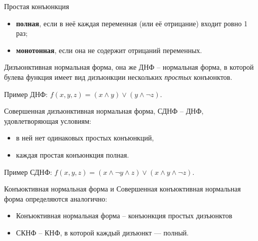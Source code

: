 \documentclass[a4paper,12pt]{article}
\begin{document}
\begin{enumerate}
        Простая конъюнкция
        \begin{itemize}
                \item \textbf{полная}, если в неё каждая переменная (или её отрицание) входит ровно 1 раз;
                \item \textbf{монотонная}, если она не содержит отрицаний переменных.
        \end{itemize}

        Дизъюнктивная нормальная форма, она же ДНФ -- нормальная форма, в которой булева функция имеет вид дизъюнкции нескольких \textit{простых} конъюнктов.

        Пример ДНФ: $f(x,y,z) = (x \land y) \lor (y \land \neg {z})$.

        Совершенная дизъюнктивная нормальная форма, СДНФ -- ДНФ, удовлетворяющая условиям:
        \begin{itemize}
                \item в ней нет одинаковых простых конъюнкций,
                \item каждая простая конъюнкция полная.
        \end{itemize}

        Пример СДНФ: $f(x,y,z) = (x \land \neg {y} \land z) \lor (x \land y \land \neg {z})$.

        Конъюктивная нормальная форма и Совершенная конъюктивная нормальная форма определяются аналогично:
        \begin{itemize}
            \item Конъюктивная нормальная форма -- конъюнкция простых дизъюнктов
            \item СКНФ -- КНФ, в которой каждый дизъюнкт --- полный.
        \end{itemize}


\end{enumerate}
\end{document}
